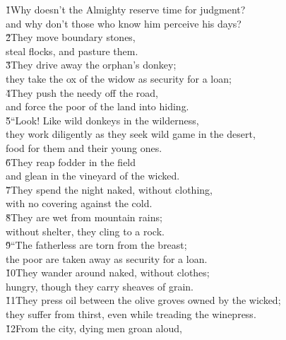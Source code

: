 \begin{poetry}
\poeml {}
\v{1}Why doesn't the Almighty reserve time for judgment? \\
\poemll    and why don't those who know him perceive his days? \\
\poeml \v{2}They move boundary stones, \\
\poemll    steal flocks, and pasture them. \\
\poeml \v{3}They drive away the orphan's donkey; \\
\poemll    they take the ox of the widow as security for a loan; \\
\poeml \v{4}They push the needy off the road, \\
\poemll    and force the poor of the land into hiding. \\
\poeml \v{5}``Look! Like wild donkeys in the wilderness, \\
\poemll    they work diligently as they seek wild game in the desert, \\
\poemlll       food for them and their young ones. \\
\poeml \v{6}They reap fodder in the field \\
\poemll    and glean in the vineyard of the wicked. \\
\poeml \v{7}They spend the night naked, without clothing, \\
\poemll    with no covering against the cold. \\
\poeml \v{8}They are wet from mountain rains; \\
\poemll    without shelter, they cling to a rock. \\
\poeml \v{9}``The fatherless are torn from the breast; \\
\poemll    the poor are taken away as security for a loan. \\
\poeml \v{10}They wander around naked, without clothes; \\
\poemll    hungry, though they carry sheaves of grain. \\
\poeml \v{11}They press oil between the olive groves owned by the wicked; \\
\poemll    they suffer from thirst, even while treading the winepress. \\
\poeml \v{12}From the city, dying men groan aloud, \\

\end{poetry}
